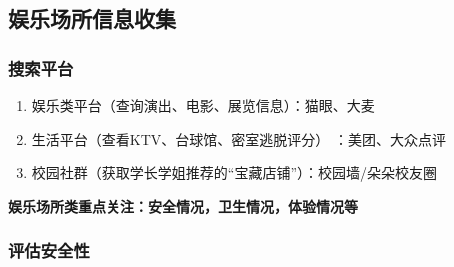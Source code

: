 \subsection{娱乐场所信息收集}
\subsubsection{搜索平台}
\begin{enumerate}
  \item 娱乐类平台（查询演出、电影、展览信息）：猫眼、大麦
  \item 生活平台（查看KTV、台球馆、密室逃脱评分） ：美团、大众点评
  \item 校园社群（获取学长学姐推荐的“宝藏店铺”）：校园墙/朵朵校友圈
\end{enumerate}
\textbf{娱乐场所类重点关注：安全情况，卫生情况，体验情况等}
\subsubsection{评估安全性}
